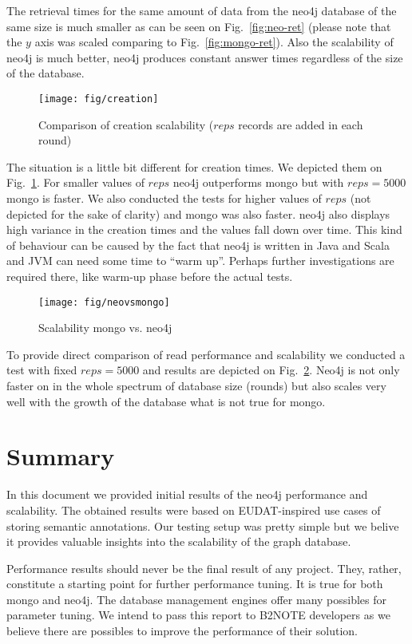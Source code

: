 \documentclass[a4paper,10pt]{article}
\begin{document}
The retrieval times for the same amount of data from the neo4j database of the 
same size is much smaller as can be seen on Fig.~\ref{fig:neo-ret} (please note 
that the $y$ axis was scaled comparing to Fig.~\ref{fig:mongo-ret}). Also the 
scalability of neo4j is much better, neo4j produces constant answer times 
regardless of the size of the database. 


\begin{figure}
\centering
 \texttt{[image: fig/creation]}
 \caption{Comparison of creation scalability ($reps$ records are added in each round)} \label{fig:creation}
\end{figure}

The situation is a little bit different for creation times. We depicted them on 
Fig.~\ref{fig:creation}. For smaller values of $reps$ neo4j outperforms mongo 
but with $reps = 5000$ mongo is faster. We also conducted the tests for higher 
values of $reps$ (not depicted for the sake of clarity) and mongo was also 
faster. neo4j also displays high variance in the creation times and the values 
fall down over time. This kind of behaviour can be caused by the fact that neo4j 
is written in Java and Scala and JVM can need some time to ``warm up''. Perhaps 
further investigations are required there, like warm-up phase before the actual 
tests.  

\begin{figure}
\centering
 \texttt{[image: fig/neovsmongo]}
 \caption{Scalability mongo vs. neo4j} \label{fig:mongovsneo}
\end{figure}

To provide direct comparison of read performance and scalability we conducted 
a test with fixed $reps = 5000$ and results are depicted on Fig.~\ref{fig:mongovsneo}.
Neo4j is not only faster on in the whole spectrum of database size (rounds) but 
also scales very well with the growth of the database what is not true for mongo.


\section{Summary}
In this document we provided initial results of the neo4j performance and 
scalability. The obtained results were based on EUDAT-inspired use cases of 
storing semantic annotations. Our testing setup was pretty simple but 
we belive it provides valuable insights into the scalability of the graph 
database. 

Performance results should never be the final result of any project. They, 
rather, constitute a starting point for further performance tuning. It is true 
for both mongo and neo4j. The database management engines offer many possibles 
for parameter tuning. We intend to pass this report to B2NOTE developers as 
we believe there are possibles to improve the performance of their solution. 
\end{document}
